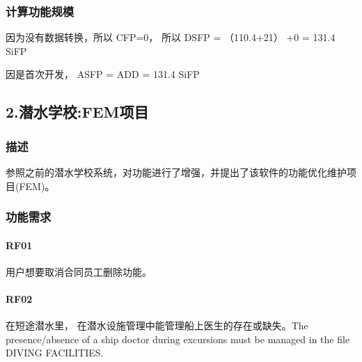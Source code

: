 \hypertarget{ux8ba1ux7b97ux529fux80fdux89c4ux6a21}{%
\subsubsection{计算功能规模}\label{ux8ba1ux7b97ux529fux80fdux89c4ux6a21}}

\begin{description}
\item[]
\end{description}

因为没有数据转换，所以 CFP=0， 所以 DSFP = （110.4+21） +0 = 131.4 SiFP

因是首次开发， ASFP = ADD = 131.4 SiFP

\hypertarget{ux6f5cux6c34ux5b66ux6821femux9879ux76ee}{%
\subsection{2.潜水学校:FEM项目}\label{ux6f5cux6c34ux5b66ux6821femux9879ux76ee}}

\hypertarget{ux63cfux8ff0-1}{%
\subsubsection{描述}\label{ux63cfux8ff0-1}}

参照之前的潜水学校系统，对功能进行了增强，并提出了该软件的功能优化维护项目(FEM)。

\hypertarget{ux529fux80fdux9700ux6c42-1}{%
\subsubsection{功能需求}\label{ux529fux80fdux9700ux6c42-1}}

\hypertarget{rf01-1}{%
\paragraph{RF01}\label{rf01-1}}

用户想要取消合同员工删除功能。

\hypertarget{rf02-1}{%
\paragraph{RF02}\label{rf02-1}}

在短途潜水里， 在潜水设施管理中能管理船上医生的存在或缺失。The
presence/absence of a ship doctor during excursions must be managed in
the file DIVING FACILITIES.

